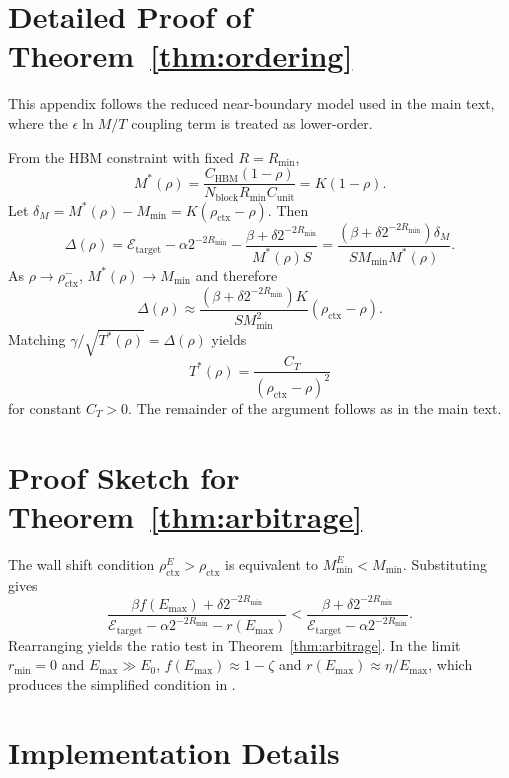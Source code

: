 \documentclass[11pt,a4paper]{article}
\theoremstyle{plain}
\theoremstyle{definition}
\begin{document}
\appendix

\section{Detailed Proof of Theorem~\ref{thm:ordering}}
\label{app:proof_order}

This appendix follows the reduced near-boundary model used in the main text, where the $\epsilon \ln M / T$ coupling term is treated as lower-order.

From the HBM constraint with fixed $R=R_{\min}$,
\[
M^*(\rho) = \frac{C_{\text{HBM}}(1-\rho)}{N_{\text{block}}R_{\min}C_{\text{unit}}}=K(1-\rho).
\]
Let $\delta_M = M^*(\rho)-M_{\min}=K(\rho_{\text{ctx}}-\rho)$. Then
\[
\Delta(\rho)=\mathcal{E}_{\text{target}}-\alpha 2^{-2R_{\min}}-\frac{\beta+\delta 2^{-2R_{\min}}}{M^*(\rho)S}
=\frac{(\beta+\delta 2^{-2R_{\min}})\delta_M}{SM_{\min}M^*(\rho)}.
\]
As $\rho\to\rho_{\text{ctx}}^{-}$, $M^*(\rho)\to M_{\min}$ and therefore
\[
\Delta(\rho)\approx \frac{(\beta+\delta 2^{-2R_{\min}})K}{SM_{\min}^{2}}(\rho_{\text{ctx}}-\rho).
\]
Matching $\gamma/\sqrt{T^*(\rho)}=\Delta(\rho)$ yields
\[
T^*(\rho)=\frac{C_T}{(\rho_{\text{ctx}}-\rho)^2}
\]
for constant $C_T>0$. The remainder of the argument follows as in the main text.

\section{Proof Sketch for Theorem~\ref{thm:arbitrage}}
\label{app:proof_arbitrage}

The wall shift condition $\rho_{\text{ctx}}^E>\rho_{\text{ctx}}$ is equivalent to $M_{\min}^E < M_{\min}$. Substituting  gives
\[
\frac{\beta f(E_{\max}) + \delta 2^{-2R_{\min}}}{\mathcal{E}_{\text{target}} - \alpha 2^{-2R_{\min}} - r(E_{\max})}
<
\frac{\beta + \delta 2^{-2R_{\min}}}{\mathcal{E}_{\text{target}} - \alpha 2^{-2R_{\min}}}.
\]
Rearranging yields the ratio test in Theorem~\ref{thm:arbitrage}. In the limit $r_{\min}=0$ and $E_{\max}\gg E_0$, $f(E_{\max})\approx 1-\zeta$ and $r(E_{\max})\approx \eta/E_{\max}$, which produces the simplified condition in .

\section{Implementation Details}
\label{app:implementation}
\end{document}
